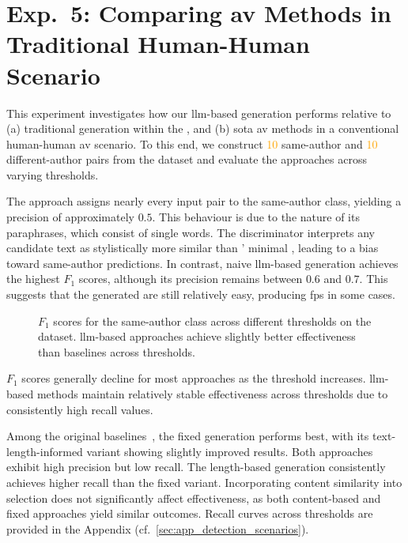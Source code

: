 \section{Exp.\ 5: Comparing \acs{av} Methods in Traditional Human-Human Scenario}
\label{sec:results_trad_av}


This experiment investigates how our \ac{llm}-based \imp{} generation performs relative to (a) traditional \imp{} generation within the \impAppr{}, and (b) \acl{sota} \ac{av} methods in a conventional human-human \ac{av} scenario. 
To this end, we construct \textcolor{orange}{10} same-author and \textcolor{orange}{10} different-author pairs from the \dataStudent{} dataset and evaluate the approaches across varying thresholds.

The \mirrorMinds{} approach assigns nearly every input pair to the same-author class, yielding a precision of approximately $0.5$. 
This behaviour is due to the nature of its paraphrases, which consist of single words. 
The discriminator interprets any candidate text as stylistically more similar than \mirrorMinds{}' minimal \imps{}, leading to a bias toward same-author predictions. 
In contrast, naive \ac{llm}-based \imp{} generation achieves the highest $F_1$ scores, although its precision remains between $0.6$ and $0.7$. 
This suggests that the generated \imps{} are still relatively easy, producing \acp{fp} in some cases.

\begin{figure}[h]
\centering
    
  \caption[Traditional \ac{av} $F_1$ scores.]{$F_1$ scores for the same-author class across different thresholds on the \dataStudent{} dataset. 
\ac{llm}-based approaches achieve slightly better effectiveness than baselines across thresholds.}
  \label{fig:human-human_f1}
\end{figure}

$F_1$ scores generally decline for most approaches as the threshold increases. 
\ac{llm}-based methods maintain relatively stable effectiveness across thresholds due to consistently high recall values. 

Among the original baselines~\citep{koppel_determining_2014}, the fixed \imp{} generation performs best, with its text-length-informed variant showing slightly improved results. 
Both approaches exhibit high precision but low recall. 
The length-based \imp{} generation consistently achieves higher recall than the fixed variant. 
Incorporating content similarity into \imp{} selection does not significantly affect effectiveness, as both content-based and fixed \imp{} approaches yield similar outcomes. 
Recall curves across thresholds are provided in the Appendix (cf.~\autoref{sec:app_detection_scenarios}).
